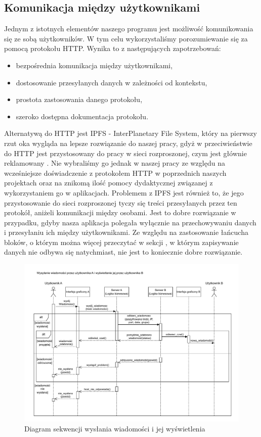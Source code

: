 \subsection{Komunikacja między użytkownikami}
\label{ssec:Komunikacja}
Jednym z istotnych elementów naszego programu jest możliwość komunikowania się ze sobą użytkowników. W tym celu wykorzystaliśmy porozumiewanie się za pomocą protokołu HTTP. Wynika to z następujących zapotrzebowań:
\begin{itemize}
    \item bezpośrednia komunikacja między użytkownikami,
    \item dostosowanie przesyłanych danych w zależności od kontekstu,
    \item prostota zastosowania danego protokołu,
    \item szeroko dostępna dokumentacja protokołu.
\end{itemize}
Alternatywą do HTTP jest IPFS - InterPlanetary File System, który na pierwszy rzut oka wygląda na  lepsze rozwiązanie do naszej pracy, gdyż w przeciwieństwie do HTTP jest przystosowany do pracy w sieci rozproszonej, czym jest głównie reklamowany \cite{IPFS}. Nie wybraliśmy go jednak w naszej pracy ze względu na wcześniejsze doświadczenie z protokołem HTTP w poprzednich naszych projektach oraz na znikomą ilość pomocy dydaktycznej związanej z wykorzystaniem go w aplikacjach. Problemem z IPFS jest również to, że jego przystosowanie do sieci rozproszonej tyczy się treści przesyłanych przez ten protokół, aniżeli komunikacji między osobami. Jest to dobre rozwiązanie w przypadku, gdyby nasza aplikacja polegała wyłącznie na przechowywaniu danych i przesyłaniu ich między użytkownikami. Ze względu na zastosowanie łańcucha bloków, o którym można więcej przeczytać w sekcji , w którym zapisywanie danych nie odbywa się natychmiast, nie jest to koniecznie dobre rozwiązanie.
\clearpage
\begin{figure}[!ht]
    \centering
		\includegraphics[width=1\linewidth]{Images/wysylanie_wiadomosci.pdf}
	\caption{Diagram sekwencji wysłania wiadomości i jej wyświetlenia}
	\label{fig:wysylanieWiadomosci}
\end{figure}
